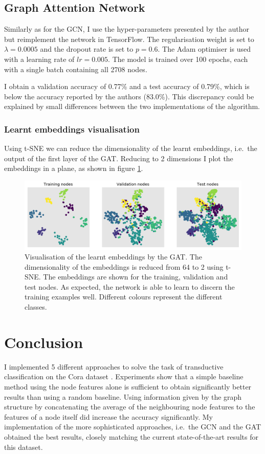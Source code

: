 \documentclass[12pt]{article}
\theoremstyle{definition}
\begin{document}
\subsection{Graph Attention Network}
Similarly as for the GCN, I use the hyper-parameters presented by the author but reimplement the network in TensorFlow. The regularisation weight is set to $\lambda = 0.0005$ and the dropout rate is set to $p=0.6$. The Adam optimiser \cite{kingma2014adam} is used with a learning rate of $\textit{lr} = 0.005$. The model is trained over 100 epochs, each with a single batch containing all 2708 nodes.

I obtain a validation accuracy of 0.77\% and a test accuracy of 0.79\%, which is below the accuracy reported by the authors (83.0\%). This discrepancy could be explained by small differences between the two implementations of the algorithm. 

\subsubsection{Learnt embeddings visualisation}
Using t-SNE we can reduce the dimensionality of the learnt embeddings, i.e.\ the output of the first layer of the GAT. Reducing to 2 dimensions I plot the embeddings in a plane, as shown in figure \ref{fig/gat_tsne}.
\begin{figure}[h]
	\includegraphics[width=1.0\textwidth]{gat/visualisation_tsne}
	\centering
	\caption{Visualisation of the learnt embeddings by the GAT. The dimensionality of the embeddings is reduced from 64 to 2 using t-SNE. The embeddings are shown for the training, validation and test nodes. As expected, the network is able to learn to discern the training examples well. Different colours represent the different classes.}
	\label{fig/gat_tsne}
\end{figure}

\section{Conclusion}
	I implemented 5 different approaches to solve the task of transductive classification on the Cora dataset \cite{cora}. Experiments show that a simple baseline method using the node features alone is sufficient to obtain significantly better results than using a random baseline. Using information given by the graph structure by concatenating the average of the neighbouring node features to the features of a node itself did increase the accuracy significantly. My implementation of the more sophisticated approaches, i.e.\ the GCN and the GAT obtained the best results, closely matching the current state-of-the-art results for this dataset.	


\end{document}
